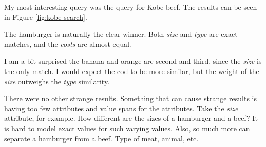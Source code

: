 \documentclass{article}
\begin{document}
My most interesting query was the query for Kobe beef. The results can be seen in Figure \ref{fig:kobe-search}.

The hamburger is naturally the clear winner. Both \textit{size} and \textit{type} are exact matches, and the \textit{costs} are almost equal.

I am a bit surprised the banana and orange are second and third, since the \textit{size} is the only match. I would expect the cod to be more similar, but the weight of the \textit{size} outweighs the \textit{type} similarity.

There were no other strange results. Something that can cause strange results is having too few attributes and value spans for the attributes. Take the \textit{size} attribute, for example. How different are the sizes of a hamburger and a beef? It is hard to model exact values for such varying values. Also, so much more can separate a hamburger from a beef. Type of meat, animal, etc.

\end{document}

